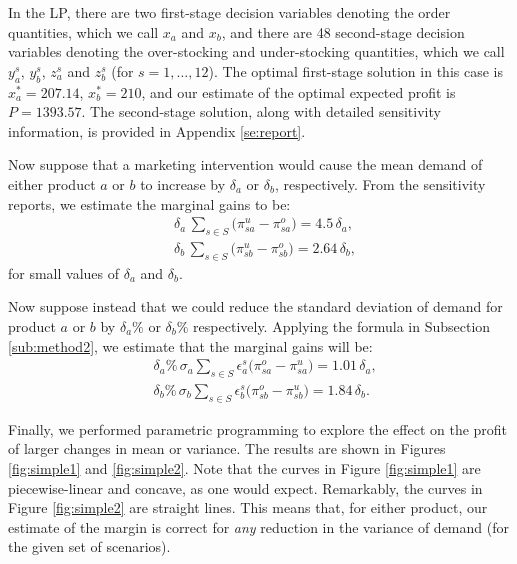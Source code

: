 \documentclass[a4paper,11pt]{article}
\begin{document}
In the LP, there are two first-stage decision variables denoting the order quantities, which we call $x_a$ and $x_b$, and there are 48 second-stage decision variables denoting the over-stocking and under-stocking quantities, which we call $y_a^s$, $y_b^s$, $z_a^s$ and $z_b^s$ (for $s = 1, \ldots, 12$). The optimal first-stage solution in this case is $x_a^*=207.14$, $x_b^*=210$, and our estimate of the optimal expected profit is $P=1393.57$. The second-stage solution, along with detailed sensitivity information, is provided in Appendix \ref{se:report}.

Now suppose that a marketing intervention would cause the mean demand of either product $a$ or $b$ to increase by $\delta_a$ or $\delta_b$, respectively. From the sensitivity reports, we estimate the marginal gains to be:
\[
\begin{aligned}
    &\delta_a \, \sum_{s \in S} \big( \pi_{sa}^u - \pi_{sa}^o \big) = 4.5 \, \delta_a,\\
    &\delta_b \, \sum_{s \in S} \big( \pi_{sb}^u - \pi_{sb}^o \big) = 2.64 \, \delta_b,
\end{aligned}
\]
for small values of $\delta_a$ and $\delta_b$.

Now suppose instead that we could reduce the standard deviation of demand for product $a$ or $b$ by $\delta_a \%$ or $\delta_b \%$ respectively. Applying the formula in Subsection \ref{sub:method2}, we estimate that the marginal gains will be:
\[
\begin{aligned}
    &\delta_a \% \, \sigma_a     \sum_{s \in S} \epsilon_a^s \big(\pi_{sa}^o - \pi_{sa}^u \big) = 1.01 \, \delta_a,\\
    &\delta_b \% \, \sigma_b     \sum_{s \in S} \epsilon_b^s \big(\pi_{sb}^o - \pi_{sb}^u \big) = 1.84 \, \delta_b.
\end{aligned}
\]

Finally, we performed parametric programming to explore the effect on the profit of larger changes in mean or variance. The results are shown in Figures \ref{fig:simple1} and 
\ref{fig:simple2}. Note that the curves in Figure \ref{fig:simple1} are piecewise-linear and concave, as one would expect. Remarkably, the curves in Figure \ref{fig:simple2} are straight lines. This means that, for either product, our estimate of the margin is correct for \emph{any} reduction in the variance of demand (for the given set of scenarios).
\end{document}
